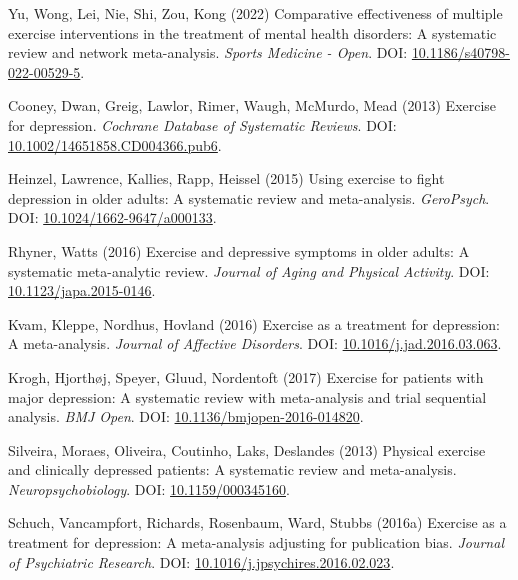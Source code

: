 \documentclass[
  letterpaper,
  DIV=11,
  numbers=noendperiod]{scrartcl}
\newlength{\cslhangindent}
\newenvironment{CSLReferences}[2] %
 {\begin{list}{}{%
  \setlength{\itemindent}{0pt}
  \setlength{\leftmargin}{0pt}
  \setlength{\parsep}{0pt}
  \ifodd #1
   \setlength{\leftmargin}{\cslhangindent}
   \setlength{\itemindent}{-1\cslhangindent}
  \fi
  \setlength{\itemsep}{#2\baselineskip}}}
 {\end{list}}
\begin{document}
\begin{CSLReferences}{0}{1}
Yu, Wong, Lei, Nie, Shi, Zou, Kong (2022) Comparative effectiveness of
multiple exercise interventions in the treatment of mental health
disorders: A systematic review and network meta-analysis. \emph{Sports
Medicine - Open}. DOI:
\href{https://doi.org/10.1186/s40798-022-00529-5}{10.1186/s40798-022-00529-5}.

Cooney, Dwan, Greig, Lawlor, Rimer, Waugh, McMurdo, Mead (2013) Exercise
for depression. \emph{Cochrane Database of Systematic Reviews}. DOI:
\href{https://doi.org/10.1002/14651858.CD004366.pub6}{10.1002/14651858.CD004366.pub6}.

Heinzel, Lawrence, Kallies, Rapp, Heissel (2015) Using exercise to fight
depression in older adults: A systematic review and meta-analysis.
\emph{GeroPsych}. DOI:
\href{https://doi.org/10.1024/1662-9647/a000133}{10.1024/1662-9647/a000133}.

Rhyner, Watts (2016) Exercise and depressive symptoms in older adults: A
systematic meta-analytic review. \emph{Journal of Aging and Physical
Activity}. DOI:
\href{https://doi.org/10.1123/japa.2015-0146}{10.1123/japa.2015-0146}.

Kvam, Kleppe, Nordhus, Hovland (2016) Exercise as a treatment for
depression: A meta-analysis. \emph{Journal of Affective Disorders}. DOI:
\href{https://doi.org/10.1016/j.jad.2016.03.063}{10.1016/j.jad.2016.03.063}.

Krogh, Hjorthøj, Speyer, Gluud, Nordentoft (2017) Exercise for patients
with major depression: A systematic review with meta-analysis and trial
sequential analysis. \emph{BMJ Open}. DOI:
\href{https://doi.org/10.1136/bmjopen-2016-014820}{10.1136/bmjopen-2016-014820}.

Silveira, Moraes, Oliveira, Coutinho, Laks, Deslandes (2013) Physical
exercise and clinically depressed patients: A systematic review and
meta-analysis. \emph{Neuropsychobiology}. DOI:
\href{https://doi.org/10.1159/000345160}{10.1159/000345160}.

Schuch, Vancampfort, Richards, Rosenbaum, Ward, Stubbs (2016a) Exercise
as a treatment for depression: A meta-analysis adjusting for publication
bias. \emph{Journal of Psychiatric Research}. DOI:
\href{https://doi.org/10.1016/j.jpsychires.2016.02.023}{10.1016/j.jpsychires.2016.02.023}.


\end{CSLReferences}
\end{document}
